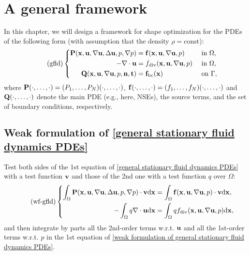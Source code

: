 \documentclass[oneside]{book}
\numberwithin{equation}{section}
\begin{document}
\section{A general framework}
In this chapter, we will design a framework for shape optimization for the PDEs of the following form (with assumption that the density $\rho = \mbox{const}$):
\begin{equation}
    \label{general stationary fluid dynamics PDEs}
    \tag{gfld}
    \left\{\begin{split}
        {\bf P}({\bf x},{\bf u},\nabla{\bf u},\Delta{\bf u},p,\nabla p) &= {\bf f}({\bf x},{\bf u},\nabla{\bf u},p) &&\mbox{ in } \Omega,\\
        -\nabla\cdot{\bf u} &= f_{\rm div}({\bf x},{\bf u},\nabla{\bf u},p) &&\mbox{ in } \Omega,\\
        {\bf Q}({\bf x},{\bf u},\nabla{\bf u},p,{\bf n},{\bf t}) &= {\bf f}_{\rm bc}({\bf x}) &&\mbox{ on } \Gamma,
    \end{split}\right.
\end{equation}
where ${\bf P}(\cdot,\ldots,\cdot) = (P_1,\ldots,P_N)(\cdot,\ldots,\cdot)$, ${\bf f}(\cdot,\ldots,\cdot) = (f_1,\ldots,f_N)(\cdot,\ldots,\cdot)$ and ${\bf Q}(\cdot,\ldots,\cdot)$ denote the main PDE (e.g., here, NSEs), the source terms, and the set of boundary conditions, respectively.

\subsection{Weak formulation of \eqref{general stationary fluid dynamics PDEs}}
Test both sides of the 1st equation of \eqref{general stationary fluid dynamics PDEs} with a test function ${\bf v}$ and those of the 2nd one with a test function $q$ over $\Omega$:
\begin{equation}
    \label{weak formulation of general stationary fluid dynamics PDEs}
    \tag{wf-gfld}
    \left\{\begin{split}
        \int_\Omega {\bf P}({\bf x},{\bf u},\nabla{\bf u},\Delta{\bf u},p,\nabla p)\cdot{\bf v}{\rm d}{\bf x} &= \int_\Omega {\bf f}({\bf x},{\bf u},\nabla{\bf u},p)\cdot{\bf v}{\rm d}{\bf x},\\
        -\int_\Omega q\nabla\cdot{\bf u}{\rm d}{\bf x} &= \int_\Omega qf_{\rm div}({\bf x},{\bf u},\nabla{\bf u},p){\rm d}{\bf x},
    \end{split}\right.
\end{equation}
and then integrate by parts all the 2nd-order terms w.r.t. ${\bf u}$ and all the 1st-order terms w.r.t. $p$ in the 1st equation of \eqref{weak formulation of general stationary fluid dynamics PDEs}.
\end{document}
